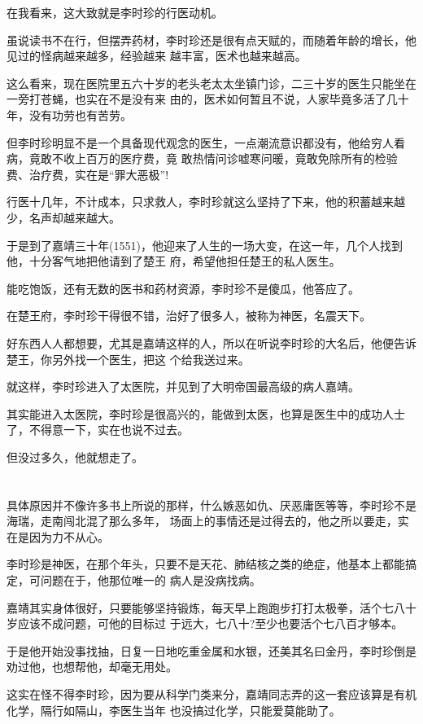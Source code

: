 \documentclass[11pt,a4paper,onecolumn]{article}
\begin{document}
在我看来，这大致就是李时珍的行医动机。

虽说读书不在行，但摆弄药材，李时珍还是很有点天赋的，而随着年龄的增长，他见过的怪病越来越多，经验越来
越丰富，医术也越来越高。

这么看来，现在医院里五六十岁的老头老太太坐镇门诊，二三十岁的医生只能坐在一旁打苍蝇，也实在不是没有来
由的，医术如何暂且不说，人家毕竟多活了几十年，没有功劳也有苦劳。

但李时珍明显不是一个具备现代观念的医生，一点潮流意识都没有，他给穷人看病，竟敢不收上百万的医疗费，竟
敢热情问诊嘘寒问暖，竟敢免除所有的检验费、治疗费，实在是``罪大恶极''!

行医十几年，不计成本，只求救人，李时珍就这么坚持了下来，他的积蓄越来越少，名声却越来越大。

于是到了嘉靖三十年(1551)，他迎来了人生的一场大变，在这一年，几个人找到他，十分客气地把他请到了楚王
府，希望他担任楚王的私人医生。

能吃饱饭，还有无数的医书和药材资源，李时珍不是傻瓜，他答应了。

在楚王府，李时珍干得很不错，治好了很多人，被称为神医，名震天下。

好东西人人都想要，尤其是嘉靖这样的人，所以在听说李时珍的大名后，他便告诉楚王，你另外找一个医生，把这
个给我送过来。

就这样，李时珍进入了太医院，并见到了大明帝国最高级的病人嘉靖。

其实能进入太医院，李时珍是很高兴的，能做到太医，也算是医生中的成功人士了，不得意一下，实在也说不过去。

但没过多久，他就想走了。

\section[\thesection]{}

具体原因并不像许多书上所说的那样，什么嫉恶如仇、厌恶庸医等等，李时珍不是海瑞，走南闯北混了那么多年，
场面上的事情还是过得去的，他之所以要走，实在是因为力不从心。

李时珍是神医，在那个年头，只要不是天花、肺结核之类的绝症，他基本上都能搞定，可问题在于，他那位唯一的
病人是没病找病。

嘉靖其实身体很好，只要能够坚持锻炼，每天早上跑跑步打打太极拳，活个七八十岁应该不成问题，可他的目标过
于远大，七八十?至少也要活个七八百才够本。

于是他开始没事找抽，日复一日地吃重金属和水银，还美其名曰金丹，李时珍倒是劝过他，也想帮他，却毫无用处。

这实在怪不得李时珍，因为要从科学门类来分，嘉靖同志弄的这一套应该算是有机化学，隔行如隔山，李医生当年
也没搞过化学，只能爱莫能助了。
\end{document}
